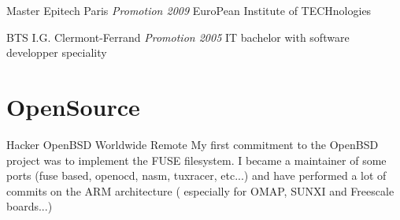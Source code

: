 \documentclass[11pt,a4paper,sans]{moderncv}
\begin{document}
{Master}
{Epitech}
{Paris}
{\textit{Promotion 2009}}
{EuroPean Institute of TECHnologies}

{BTS}
{I.G.}
{Clermont-Ferrand}
{\textit{Promotion 2005}}
{IT bachelor with software developper speciality}

\section{OpenSource}

{Hacker}
{OpenBSD}
{Worldwide Remote}
{}
{My first commitment to the OpenBSD project was to implement the FUSE filesystem.\newline{}
I became a maintainer of some ports (fuse based, openocd, nasm, tuxracer, etc...) and have
performed a lot of commits on the ARM architecture ( especially for OMAP, SUNXI and
Freescale boards...)
}
\end{document}
